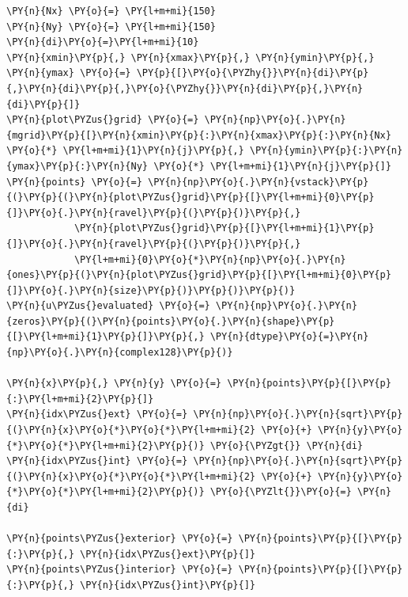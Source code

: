 \begin{tcolorbox}
\begin{Verbatim}[commandchars=\\\{\}]
\PY{n}{Nx} \PY{o}{=} \PY{l+m+mi}{150}
\PY{n}{Ny} \PY{o}{=} \PY{l+m+mi}{150}
\PY{n}{di}\PY{o}{=}\PY{l+m+mi}{10}
\PY{n}{xmin}\PY{p}{,} \PY{n}{xmax}\PY{p}{,} \PY{n}{ymin}\PY{p}{,} \PY{n}{ymax} \PY{o}{=} \PY{p}{[}\PY{o}{\PYZhy{}}\PY{n}{di}\PY{p}{,}\PY{n}{di}\PY{p}{,}\PY{o}{\PYZhy{}}\PY{n}{di}\PY{p}{,}\PY{n}{di}\PY{p}{]}
\PY{n}{plot\PYZus{}grid} \PY{o}{=} \PY{n}{np}\PY{o}{.}\PY{n}{mgrid}\PY{p}{[}\PY{n}{xmin}\PY{p}{:}\PY{n}{xmax}\PY{p}{:}\PY{n}{Nx} \PY{o}{*} \PY{l+m+mi}{1}\PY{n}{j}\PY{p}{,} \PY{n}{ymin}\PY{p}{:}\PY{n}{ymax}\PY{p}{:}\PY{n}{Ny} \PY{o}{*} \PY{l+m+mi}{1}\PY{n}{j}\PY{p}{]}
\PY{n}{points} \PY{o}{=} \PY{n}{np}\PY{o}{.}\PY{n}{vstack}\PY{p}{(}\PY{p}{(}\PY{n}{plot\PYZus{}grid}\PY{p}{[}\PY{l+m+mi}{0}\PY{p}{]}\PY{o}{.}\PY{n}{ravel}\PY{p}{(}\PY{p}{)}\PY{p}{,}
			\PY{n}{plot\PYZus{}grid}\PY{p}{[}\PY{l+m+mi}{1}\PY{p}{]}\PY{o}{.}\PY{n}{ravel}\PY{p}{(}\PY{p}{)}\PY{p}{,}
            \PY{l+m+mi}{0}\PY{o}{*}\PY{n}{np}\PY{o}{.}\PY{n}{ones}\PY{p}{(}\PY{n}{plot\PYZus{}grid}\PY{p}{[}\PY{l+m+mi}{0}\PY{p}{]}\PY{o}{.}\PY{n}{size}\PY{p}{)}\PY{p}{)}\PY{p}{)}
\PY{n}{u\PYZus{}evaluated} \PY{o}{=} \PY{n}{np}\PY{o}{.}\PY{n}{zeros}\PY{p}{(}\PY{n}{points}\PY{o}{.}\PY{n}{shape}\PY{p}{[}\PY{l+m+mi}{1}\PY{p}{]}\PY{p}{,} \PY{n}{dtype}\PY{o}{=}\PY{n}{np}\PY{o}{.}\PY{n}{complex128}\PY{p}{)}
         
\PY{n}{x}\PY{p}{,} \PY{n}{y} \PY{o}{=} \PY{n}{points}\PY{p}{[}\PY{p}{:}\PY{l+m+mi}{2}\PY{p}{]}
\PY{n}{idx\PYZus{}ext} \PY{o}{=} \PY{n}{np}\PY{o}{.}\PY{n}{sqrt}\PY{p}{(}\PY{n}{x}\PY{o}{*}\PY{o}{*}\PY{l+m+mi}{2} \PY{o}{+} \PY{n}{y}\PY{o}{*}\PY{o}{*}\PY{l+m+mi}{2}\PY{p}{)} \PY{o}{\PYZgt{}} \PY{n}{di}
\PY{n}{idx\PYZus{}int} \PY{o}{=} \PY{n}{np}\PY{o}{.}\PY{n}{sqrt}\PY{p}{(}\PY{n}{x}\PY{o}{*}\PY{o}{*}\PY{l+m+mi}{2} \PY{o}{+} \PY{n}{y}\PY{o}{*}\PY{o}{*}\PY{l+m+mi}{2}\PY{p}{)} \PY{o}{\PYZlt{}}\PY{o}{=} \PY{n}{di}
         
\PY{n}{points\PYZus{}exterior} \PY{o}{=} \PY{n}{points}\PY{p}{[}\PY{p}{:}\PY{p}{,} \PY{n}{idx\PYZus{}ext}\PY{p}{]}
\PY{n}{points\PYZus{}interior} \PY{o}{=} \PY{n}{points}\PY{p}{[}\PY{p}{:}\PY{p}{,} \PY{n}{idx\PYZus{}int}\PY{p}{]}
\end{Verbatim}
\end{tcolorbox}


